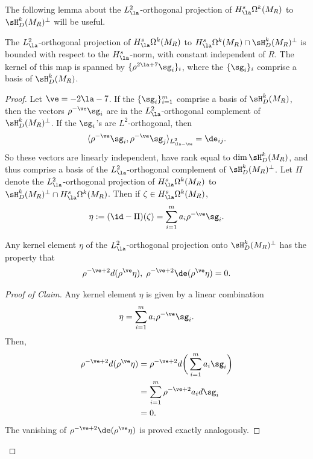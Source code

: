 \documentclass[hidelinks, 12pt, oneside, reqno]{amsart}
\begin{document}
The following lemma about the $L^2_{\la}$-orthogonal projection of $H^s_\la \Omega^k(M_R)$ to $\sH^k_D(M_R)^\perp$ will be useful.

\begin{lem}\label{lemma projection to harmonic dirichlet fields}
    The $L^2_{\la}$-orthogonal projection of $H^s_\la \Omega^k(M_R)$ to $H^s_\la \Omega^k(M_R) \cap \sH^k_D(M_R)^\perp$ is bounded with respect to the $H^s_{\la}$-norm, with constant independent of $R$. The kernel of this map is spanned by $\{\rho^{2\la + 7} \sg_i\}_i$, where the $\{\sg_i\}_i$ comprise a basis of $\sH^k_D(M_R)$.
\end{lem}

\begin{proof}
    Let $\ve = -2\la - 7$. If the $\{\sg_i\}_{i=1}^m$ comprise a basis of $\sH^k_D(M_R)$, then the vectors $\rho^{-\ve} \sg_i$ are in the $L^2_{\la}$-orthogonal complement of $\sH^k_D(M_R)^\perp$. If the $\sg_i$'s are $L^2$-orthogonal, then
    \[
    \langle \rho^{-\ve} \sg_i, \rho^{-\ve} \sg_j \rangle_{L^2_{\la - \ve}} = \de_{ij}.
    \]
    So these vectors are linearly independent, have rank equal to $\dim \sH^k_D(M_R)$, and thus comprise a basis of the $L^2_{\la}$-orthogonal complement of $\sH^k_D(M_R)^\perp$. Let $\Pi$ denote the 
     $L^2_{\la}$-orthogonal projection of $H^s_\la \Omega^k(M_R)$ to $\sH^k_D(M_R)^\perp \cap H^s_\la \Omega^k(M_R)$. Then if $\zeta \in H^s_\la \Omega^k(M_R)$,
     \[
     \eta := (\id - \Pi)(\zeta) = \sum_{i=1}^m a_i \rho^{-\ve} \sg_i.
     \]
     \begin{clm}\label{claim adjoint harmonic field}
    Any kernel element $\eta$ of the $L^2_\la$-orthogonal projection onto $\sH^k_D(M_R)^\perp$ has the property that
    \[
    \rho^{-\ve + 2} d (\rho^{\ve} \eta), \; \rho^{-\ve+2} \de (\rho^{\ve} \eta )= 0.
    \]
    \end{clm}
    \begin{proof}[Proof of Claim]
    Any kernel element $\eta$ is given by a linear combination
    \[
    \eta = \sum_{i=1}^m a_i \rho^{-\ve} \sg_i.
    \]
    Then, 
    \begin{align*}
    \rho^{-\ve + 2 } d (\rho^{\ve} \eta) &= \rho^{-\ve + 2} d \bigg( \sum_{i=1}^m a_i \sg_i \bigg) \\
    &= \sum_{i=1}^m \rho^{-\ve + 2}  a_i d \sg_i \\
    &= 0.
    \end{align*}
    The vanishing of $\rho^{-\ve + 2} \de (\rho^{\ve} \eta )$ is proved exactly analogously.
    \end{proof}

\end{proof}
\end{document}
